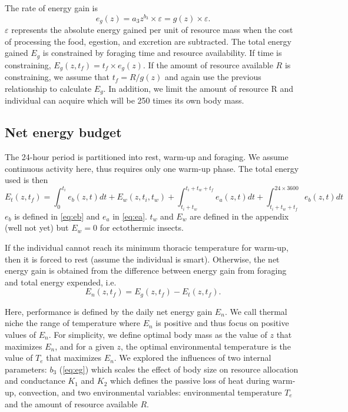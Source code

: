 The rate of energy gain is  
\begin{equation} \label{eq:eg}
	e_g(z) = a_3 z^{b_3} \times \varepsilon  = g(z) \times \varepsilon.
\end{equation}
$\varepsilon$ represents the absolute energy gained per unit of resource mass when the cost of processing the food, egestion, and excretion are subtracted. 
The total energy gained $E_g$ is constrained by foraging time and resource availability.
If time is constraining, $E_g(z, t_f) = t_f \times e_g(z)$.
If the amount of resource available $R$  is constraining, we assume that $t_f = R/g(z)$ and again use the previous relationship to calculate $E_g$.
In addition, we limit the amount of resource R and individual can acquire which will be 250 times its own body mass. %

  
\subsection*{Net energy budget}
The 24-hour period is partitioned into rest, warm-up and foraging.
We assume continuous activity here, thus requires only one warm-up phase. 
The total energy used is then
\begin{equation} \label{eq:et}
	E_t(z, t_f) = \int_0^{t_i} e_b(z, t) dt +  E_w(z,t_i, t_w) + \int_{t_i+ t_w}^{t_i +t_w + t_f} e_a(z,t) dt + \int_{t_i+t_w+t_f}^{24\times 3600} e_b(z, t) dt 
\end{equation}
$e_b$ is defined in \cref{eq:eb}  and $e_a$ in \cref{eq:ea}.
$t_w$  and $E_w$ are defined in the appendix (well not yet)  but $E_w= 0$ for ectothermic insects.
  
If the individual cannot reach its minimum thoracic temperature for warm-up, then it is forced to rest (assume the individual is smart).
Otherwise, the net energy gain is obtained from the  difference between energy gain from foraging and total energy expended, i.e.
\[ 
	E_n(z, t_f) = E_g(z,t_f) - E_t(z, t_f).
\]

Here, performance is defined by the daily net energy gain $E_n$. 
We call thermal niche the range of temperature where $E_n$ is positive and thus focus on positive values of $E_n$. 
For simplicity, we define optimal body mass  as the value of $z$ that maximizes $E_n$, and for a given $z$, the optimal environmental temperature is the value of $T_e$ that maximizes $E_n$.
We explored the influences of two internal parameters: $b_3$ (\cref{eq:eg}) which scales the effect of body size on resource allocation and conductance $K_1$ and $K_2$ which defines the passive loss of heat during warm-up, convection, and two environmental variables: environmental temperature $T_e$ and the amount of resource available $R$.

